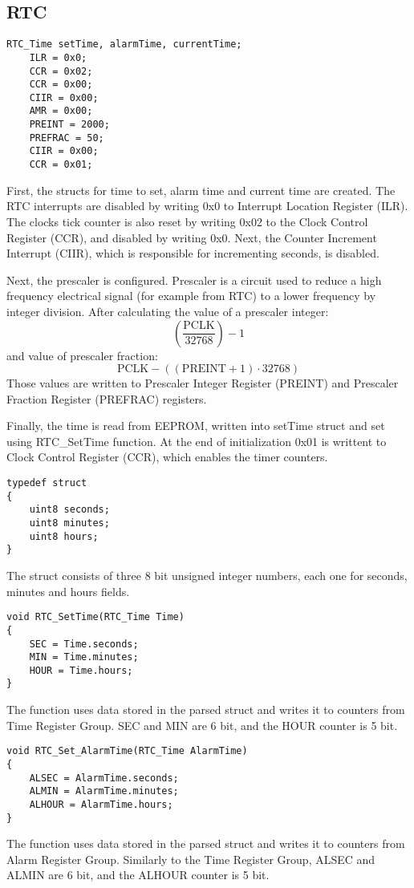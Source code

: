 \documentclass[10pt]{article}
\begin{document}
    \subsection{RTC}
	\begin{lstlisting}[caption = {RTC initialization}]
	RTC_Time setTime, alarmTime, currentTime;
	ILR = 0x0; 
	CCR = 0x02; 
	CCR = 0x00;
	CIIR = 0x00;
	AMR = 0x00;  
	PREINT = 2000;
	PREFRAC = 50;
	CIIR = 0x00;
   	CCR = 0x01;
	\end{lstlisting}

	First, the structs for time to set, alarm time and current time are created. The RTC interrupts are disabled by writing 0x0 to Interrupt Location Register (ILR).  The clocks tick counter is also reset by writing 0x02 to the Clock Control Register (CCR), and disabled by writing 0x0. Next, the Counter Increment Interrupt (CIIR), which is responsible for incrementing seconds, is disabled. 

Next, the prescaler is configured. Prescaler is a circuit used to reduce a high frequency electrical signal (for example from RTC) to a lower frequency by integer division. After calculating the value of a prescaler integer:
\[ \left(\frac{\mathrm{PCLK}}{32768}\right) - 1 \]
and value of prescaler fraction:
\[ \mathrm{PCLK} - \left((\mathrm{PREINT} + 1) \cdot 32768\right) \]
Those values are written to Prescaler Integer Register (PREINT) and Prescaler Fraction Register (PREFRAC) registers.

Finally, the time is read from EEPROM, written into setTime struct and set using RTC\_SetTime function. At the end of initialization 0x01 is writtent to Clock Control Register (CCR), which enables the timer counters.

	\begin{lstlisting}[caption = {RTC struct}]
typedef struct
{
	uint8 seconds;
	uint8 minutes;
	uint8 hours;
} 
	\end{lstlisting}
	The struct consists of three 8 bit unsigned integer numbers, each one for seconds, minutes and hours fields.

	\begin{lstlisting}[caption = {Setting time in the register function}]
void RTC_SetTime(RTC_Time Time)
{
	SEC = Time.seconds;
	MIN = Time.minutes;
	HOUR = Time.hours;
}
	\end{lstlisting}
	The function uses data stored in the parsed struct and writes it to counters from Time Register Group. SEC and MIN are 6 bit, and the HOUR counter is 5 bit.

	\begin{lstlisting}[caption = {Setting alarm time in the register function}]
void RTC_Set_AlarmTime(RTC_Time AlarmTime)
{
	ALSEC = AlarmTime.seconds;
	ALMIN = AlarmTime.minutes;
	ALHOUR = AlarmTime.hours;
}
	\end{lstlisting}
	The function uses data stored in the parsed struct and writes it to counters from Alarm Register Group. Similarly to the Time Register Group, ALSEC and ALMIN are 6 bit, and the ALHOUR counter is 5 bit.
\end{document}

